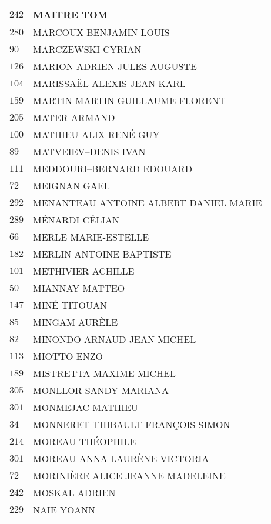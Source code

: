 \begin{xltabular}{\linewidth}{|l|X|}
    \hline
    $242$ & MAITRE TOM \\
    \hline
    $280$ & MARCOUX BENJAMIN LOUIS \\
    \hline
    $90$ & MARCZEWSKI CYRIAN \\
    \hline
    $126$ & MARION ADRIEN JULES AUGUSTE \\
    \hline
    $104$ & MARISSAËL ALEXIS JEAN KARL \\
    \hline
    $159$ & MARTIN MARTIN GUILLAUME FLORENT \\
    \hline
    $205$ & MATER ARMAND \\
    \hline
    $100$ & MATHIEU ALIX RENÉ GUY \\
    \hline
    $89$ & MATVEIEV--DENIS IVAN \\
    \hline
    $111$ & MEDDOURI--BERNARD EDOUARD \\
    \hline
    $72$ & MEIGNAN GAEL \\
    \hline
    $292$ & MENANTEAU ANTOINE ALBERT DANIEL MARIE \\
    \hline
    $289$ & MÉNARDI CÉLIAN \\
    \hline
    $66$ & MERLE MARIE-ESTELLE \\
    \hline
    $182$ & MERLIN ANTOINE BAPTISTE \\
    \hline
    $101$ & METHIVIER ACHILLE \\
    \hline
    $50$ & MIANNAY MATTEO \\
    \hline
    $147$ & MINÉ TITOUAN \\
    \hline
    $85$ & MINGAM AURÈLE \\
    \hline
    $82$ & MINONDO ARNAUD JEAN MICHEL \\
    \hline
    $113$ & MIOTTO ENZO \\
    \hline
    $189$ & MISTRETTA MAXIME MICHEL \\
    \hline
    $305$ & MONLLOR SANDY MARIANA \\
    \hline
    $301$ & MONMEJAC MATHIEU \\
    \hline
    $34$ & MONNERET THIBAULT FRANÇOIS SIMON \\
    \hline
    $214$ & MOREAU THÉOPHILE \\
    \hline
    $301$ & MOREAU ANNA LAURÈNE VICTORIA \\
    \hline
    $72$ & MORINIÈRE ALICE JEANNE MADELEINE \\
    \hline
    $242$ & MOSKAL ADRIEN \\
    \hline
    $229$ & NAIE YOANN \\

\end{xltabular}
